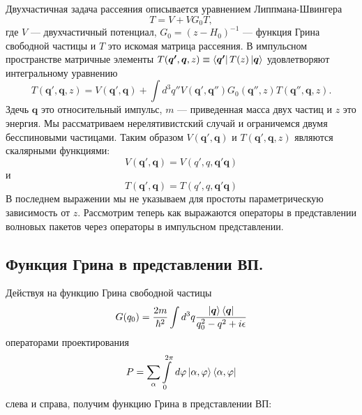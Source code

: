 \documentclass[a4paper,12pt]{article}
\newcommand{\vect}[1]{\boldsymbol{#1}}
\begin{document}
Двухчастичная задача рассеяния описывается уравнением Липпмана-Швингера\cite{sakurai}
\begin{equation}
    T = V + V G_0 T,
\end{equation}
где $V$ — двухчастичный потенциал, $G_0 = (z - H_0)^{-1}$ — функция Грина свободной частицы и $T$ это искомая матрица рассеяния. В импульсном пространстве матричные элементы $T(\vect{q'},\vect{q},z) \equiv \bra{\vect{q'}}T(z)\ket{\vect{q}}$  удовлетворяют интегральному уравнению
\begin{equation}
    T(\vect{q'},\vect{q}, z) = V(\vect{q'},\vect{q}) + \int d^3q'' V(\vect{q'},\vect{q''}) G_0(\vect{q''},z) T(\vect{q''},\vect{q}, z). 
\end{equation}
Здечь $\vect{q}$ это относительный импульс, $m$ — приведенная масса двух частиц и $z$ это энергия. Мы рассматриваем нерелятивистский случай и ограничемся двумя бесспиновыми частицами. Таким образом $V(\vect{q'},\vect{q})$ и $T(\vect{q'},\vect{q},z)$ являются скалярными функциями:
\begin{equation}
    V(\vect{q'},\vect{q}) = V(q',q,\vect{q'}\vect{q})
\end{equation}
и
\begin{equation}
    T(\vect{q'},\vect{q}) = T(q',q,\vect{q'}\vect{q})
\end{equation}
В последнем выражении мы не указываем для простоты параметрическую зависимость от $z$. Рассмотрим теперь как выражаются операторы в представлении волновых пакетов через операторы в импульсном представлении.

\newline
\subsection{Функция Грина в представлении ВП.}
Действуя на функцию Грина свободной частицы
\[
	G(q_0) = \frac{2m}{\hbar^2} \int d^3q \frac{ \ket{\vect{q}} \bra{ \vect{q} } }{ q_0^2 - q^2 + i\epsilon } 
\]
операторами проектирования
\[
	P = \sum\limits_\alpha \int\limits_0^{2\pi} \,d \varphi \ket{\alpha,\varphi}\bra{\alpha,\varphi}
\] 
слева и справа, получим функцию Грина в представлении ВП:
\end{document}
